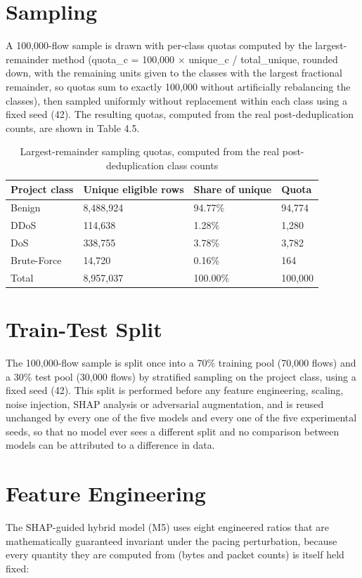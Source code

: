\documentclass[12pt,a4paper]{report}
\begin{document}
\section{Sampling}
A 100,000-flow sample is drawn with per-class quotas computed by the largest-remainder method (quota\_c = 100,000 $\times$ unique\_c / total\_unique, rounded down, with the remaining units given to the classes with the largest fractional remainder, so quotas sum to exactly 100,000 without artificially rebalancing the classes), then sampled uniformly without replacement within each class using a fixed seed (42). The resulting quotas, computed from the real post-deduplication counts, are shown in Table 4.5.

\begin{table}[h]\centering
\caption{Largest-remainder sampling quotas, computed from the real post-deduplication class counts}
\begin{tabularx}{\linewidth}{XXXX}
\toprule
\textbf{Project class} & \textbf{Unique eligible rows} & \textbf{Share of unique} & \textbf{Quota} \\
\midrule
Benign & 8,488,924 & 94.77\% & 94,774 \\
DDoS & 114,638 & 1.28\% & 1,280 \\
DoS & 338,755 & 3.78\% & 3,782 \\
Brute-Force & 14,720 & 0.16\% & 164 \\
Total & 8,957,037 & 100.00\% & 100,000 \\
\bottomrule
\end{tabularx}
\end{table}
\section{Train-Test Split}
The 100,000-flow sample is split once into a 70\% training pool (70,000 flows) and a 30\% test pool (30,000 flows) by stratified sampling on the project class, using a fixed seed (42). This split is performed before any feature engineering, scaling, noise injection, SHAP analysis or adversarial augmentation, and is reused unchanged by every one of the five models and every one of the five experimental seeds, so that no model ever sees a different split and no comparison between models can be attributed to a difference in data.

\section{Feature Engineering}
The SHAP-guided hybrid model (M5) uses eight engineered ratios that are mathematically guaranteed invariant under the pacing perturbation, because every quantity they are computed from (bytes and packet counts) is itself held fixed:
\end{document}
